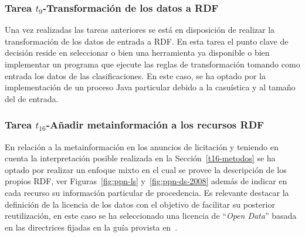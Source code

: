 \subsubsection{Tarea $t_9$-Transformación de los datos a RDF }
Una vez realizadas las tareas anteriores se está en disposición de realizar la transformación 
de los datos de entrada a \gls{RDF}. En esta tarea el punto clave de decisión reside en seleccionar o bien 
una herramienta ya disponible o bien implementar un programa que ejecute las reglas de transformación 
tomando como entrada los datos de las clasificaciones. En este caso, se ha optado por la implementación 
de un proceso Java particular debido a la casuística y al tamaño del \dataset de entrada.
% 
\subsubsection{Tarea $t_{16}$-Añadir metainformación a los recursos RDF}\label{t16-ppn}
En relación a la metainformación en los anuncios de licitación y teniendo en cuenta 
la interpretación posible realizada en la Sección~\ref{t16-metodos} se ha optado 
por realizar un enfoque mixto en el cual se provee la descripción de los propios 
\datasets \gls{RDF}, ver Figuras~\ref{fig:ppn-ls} y~\ref{fig:ppn-ds-2008} además de indicar en 
cada recurso su información particular de procedencia. Es relevante destacar 
la definición de la licencia de los datos con el objetivo de facilitar 
su posterior reutilización, en este caso se ha seleccionado una licencia de ``\textit{Open Data}'' basada en las 
directrices fijadas en la guía provista en~\cite{od-license}.
% 
